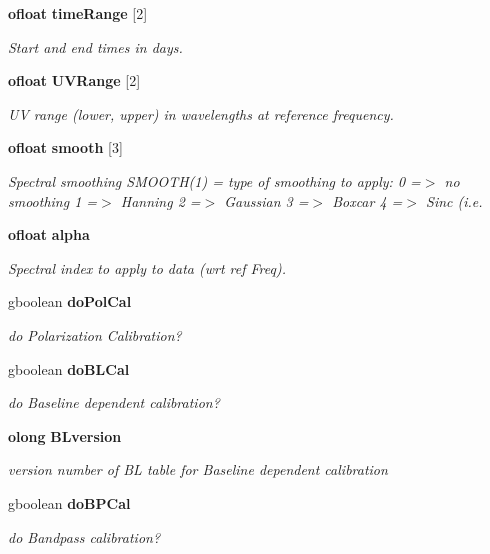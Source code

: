 \begin{CompactItemize}
{\bf ofloat} {\bf time\-Range} [2]
\begin{CompactList}\small\item\em Start and end times in days. \item\end{CompactList}\item 
{\bf ofloat} {\bf UVRange} [2]
\begin{CompactList}\small\item\em UV range (lower, upper) in wavelengths at reference frequency. \item\end{CompactList}\item 
{\bf ofloat} {\bf smooth} [3]
\begin{CompactList}\small\item\em Spectral smoothing SMOOTH(1) = type of smoothing to apply: 0 =$>$ no smoothing 1 =$>$ Hanning 2 =$>$ Gaussian 3 =$>$ Boxcar 4 =$>$ Sinc (i.e. \item\end{CompactList}\item 
{\bf ofloat} {\bf alpha}
\begin{CompactList}\small\item\em Spectral index to apply to data (wrt ref Freq). \item\end{CompactList}\item 
gboolean {\bf do\-Pol\-Cal}
\begin{CompactList}\small\item\em do Polarization Calibration? \item\end{CompactList}\item 
gboolean {\bf do\-BLCal}
\begin{CompactList}\small\item\em do Baseline dependent calibration? \item\end{CompactList}\item 
{\bf olong} {\bf BLversion}
\begin{CompactList}\small\item\em version number of BL table for Baseline dependent calibration \item\end{CompactList}\item 
gboolean {\bf do\-BPCal}
\begin{CompactList}\small\item\em do Bandpass calibration? \item\end{CompactList}\item 

\end{CompactItemize}

